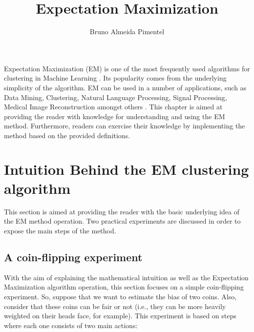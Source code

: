 \title{Expectation Maximization}
\label{chp:label}
\author{Bruno Almeida Pimentel}
\maketitle



Expectation Maximization (EM) is one of the most frequently used algorithms for clustering in Machine Learning \cite{moon1996expectation, do2008expectation}. Its popularity comes from the underlying simplicity of the algorithm. EM can be used in a number of applications, such as Data Mining, Clustering, Natural Language Processing, Signal Processing, Medical Image Reconstruction amongst others \cite{dellaert2002expectation, dempster1977maximum, ceppellini1955estimation, tzoreff2017expectation, li2019expectation}. This chapter is aimed at providing the reader with knowledge for understanding and using the EM method. Furthermore, readers can exercise their knowledge by implementing the method based on the provided definitions. 



\section{Intuition Behind the EM clustering algorithm}

This section is aimed at providing the reader with the basic underlying idea of the EM method operation. Two practical experiments are discussed in order to expose the main steps of the method.

\subsection{A coin-flipping experiment}
\label{sec:coin}

With the aim of explaining the mathematical intuition as well as the Expectation Maximization algorithm operation, this section focuses on a simple coin-flipping experiment. So, suppose that we want to estimate the bias of two coins. Also, consider that these coins can be fair or not (i.e., they can be more heavily weighted on their heads face, for example). This experiment is based on steps where each one consists of two main actions:

